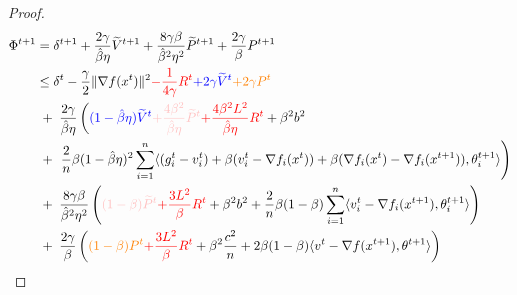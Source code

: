 \documentclass[a4paper,11pt]{article}
\begin{document}
\begin{proof}
    \begin{align*}
        \Phi^{t+1} &= \delta^{t+1} 
        + \frac{2\gamma}{\hat{\beta}\eta}\wtilde{V}^{t+1} 
        + \frac{8\gamma\beta}{\hat{\beta}^2\eta^2}\wtilde{P}^{t+1} 
        + \frac{2\gamma}{\beta}P^{t+1}\\
        &\le \delta^t - \frac{\gamma}{2}\|\nabla f(x^t)\|^2  {\color{red} - \frac{1}{4\gamma}R^t}
        {\color{blue} + 2\gamma \wtilde{V}^t }
       {\color{orange}+ 2\gamma P^t}\\
        & \;+\; \frac{2\gamma}{\hat{\beta}\eta}\left(
    {\color{blue} (1-\hat{\beta}\eta)\wtilde{V}^{t} }
    {\color{pink} + \frac{4\beta^2}{\hat{\beta}\eta}\wtilde{P}^{t}}
    {\color{red} + \frac{4\beta^2L^2}{\hat{\beta}\eta}R^{t}}
    + \beta^2b^2
    \right.\\
    &\;+\; \left.\frac{2}{n}\beta(1-\hat{\beta}\eta)^2\sum_{i=1}^n\<(g_i^{t} - v_i^{t}) + \beta(v_i^{t} - \nabla f_i(x^{t})) + \beta(\nabla f_i(x^{t})-\nabla f_i(x^{t+1})), \theta^{t+1}_i>\right)\\
    &\;+\; \frac{8\gamma\beta}{\hat{\beta}^2\eta^2}\left({\color{pink}(1-\beta)\wtilde{P}^t} 
    {\color{red} + \frac{3L^2}{\beta}R^t }
    + \beta^2b^2 
    + \frac{2}{n}\beta(1-\beta)\sum_{i=1}^n\<v_i^t - \nabla f_i(x^{t+1}), \theta^{t+1}_i>\right)\\
    &\;+\; \frac{2\gamma}{\beta}\left({\color{orange} (1-\beta)P^t }
    {\color{red} 
    + \frac{3L^2}{\beta}R^t }
    + \beta^2\frac{c^2}{n}
    + 2\beta(1-\beta)\<v^t - \nabla f(x^{t+1}), \theta^{t+1}>\right)
    \end{align*}
    

\end{proof}
\end{document}
